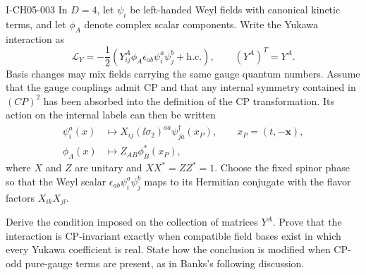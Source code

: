 \begin{exercise}{I-CH05-003}
In $D=4$, let $\psi_i$ be left-handed Weyl fields with canonical kinetic terms, and let
$\phi_A$ denote complex scalar components.  Write the Yukawa interaction as
\begin{equation*}
  \mathcal L_Y=-\frac12\left(
    Y^A_{ij}\phi_A\epsilon_{ab}\psi_i^a\psi_j^b
    +\mathrm{h.c.}\right),
  \qquad (Y^A)^T=Y^A.
\end{equation*}
Basis changes may mix fields carrying the same gauge quantum numbers.  Assume
that the gauge couplings admit CP and that any internal symmetry contained in
$(CP)^2$ has been absorbed into the definition of the CP transformation.  Its
action on the internal labels can then be written
\begin{align*}
  \psi_i^a(x)&\longmapsto
    X_{ij}(\ii\sigma_2)^{a\dot a}
    \psi_{j\dot a}^\dagger(x_P),\qquad x_P=(t,-\mathbf x),\\
  \phi_A(x)&\longmapsto Z_{AB}\phi_B^*(x_P),
\end{align*}
where $X$ and $Z$ are unitary and
$XX^*=ZZ^*=1$.  Choose the fixed spinor phase so that the Weyl scalar
$\epsilon_{ab}\psi_i^a\psi_j^b$ maps to its Hermitian conjugate with the
flavor factors $X_{ik}X_{jl}$.

Derive the condition imposed on the collection of matrices $Y^A$.  Prove that
the interaction is CP-invariant exactly when compatible field bases exist in
which every Yukawa coefficient is real.  State how the conclusion is modified
when CP-odd pure-gauge terms are present, as in Banks's following discussion.
\end{exercise}
